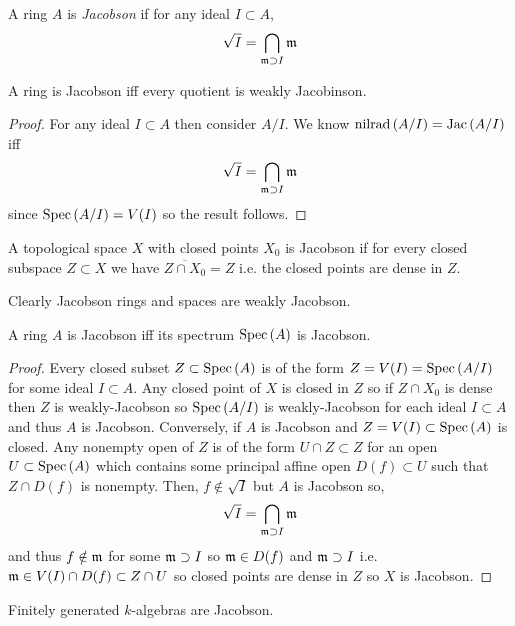 \documentclass[12pt]{article}
\begin{document}
\begin{definition}
A ring $A$ is \textit{Jacobson} if for any ideal $I \subset A$,
\[ \sqrt{I} = \bigcap_{\mathfrak{m} \supset I} \mathfrak{m} \]
\end{definition}

\begin{proposition}
A ring is Jacobson iff every quotient is weakly Jacobinson.
\end{proposition}

\begin{proof}
For any ideal $I \subset A$ then consider $A / I$. We know $\mathrm{nilrad}\left( A / I \right) = \mathrm{Jac}\left( A / I \right)$ iff
\[ \sqrt{I} = \bigcap_{\mathfrak{m} \supset I} \mathfrak{m} \]
since $\mathrm{Spec}\left( A / I \right) = V(I)$ so the result follows.
\end{proof}

\begin{definition}
A topological space $X$ with closed points $X_0$ is Jacobson if for every closed subspace $Z \subset X$ we have $\overline{Z \cap X_0} = Z$ i.e. the closed points are dense in $Z$. 
\end{definition}

\begin{remark}
Clearly Jacobson rings and spaces are weakly Jacobson. 
\end{remark}

\begin{proposition}
A ring $A$ is Jacobson iff its spectrum $\mathrm{Spec}\left( A \right)$ is Jacobson.
\end{proposition}

\begin{proof}
Every closed subset $Z \subset \mathrm{Spec}\left( A \right)$ is of the form $Z = V(I) = \mathrm{Spec}\left( A / I \right)$ for some ideal $I \subset A$. Any closed point of $X$ is closed in $Z$ so if $Z \cap X_0$ is dense then $Z$ is weakly-Jacobson so $\mathrm{Spec}\left( A / I \right)$ is weakly-Jacobson for each ideal $I \subset A$ and thus $A$ is Jacobson. Conversely, if $A$ is Jacobson and $Z = V(I) \subset \mathrm{Spec}\left( A \right)$ is closed. Any nonempty open of $Z$ is of the form $U \cap Z \subset Z$ for an open $U \subset \mathrm{Spec}\left( A \right)$ which contains some principal affine open $D(f) \subset U$ such that $Z \cap D(f)$ is nonempty. Then, $f \notin \sqrt{I}$ but $A$ is Jacobson so,
\[ \sqrt{I} = \bigcap_{\mathfrak{m} \supset I} \mathfrak{m} \]
and thus $f \notin \mathfrak{m}$ for some $\mathfrak{m} \supset I$ so $\mathfrak{m} \in D(f)$ and $\mathfrak{m} \supset I$ i.e. $\mathfrak{m} \in V(I) \cap D(f) \subset Z \cap U$ so closed points are dense in $Z$ so $X$ is Jacobson.
\end{proof}

\begin{theorem}
Finitely generated $k$-algebras are Jacobson.
\end{theorem}
\end{document}
